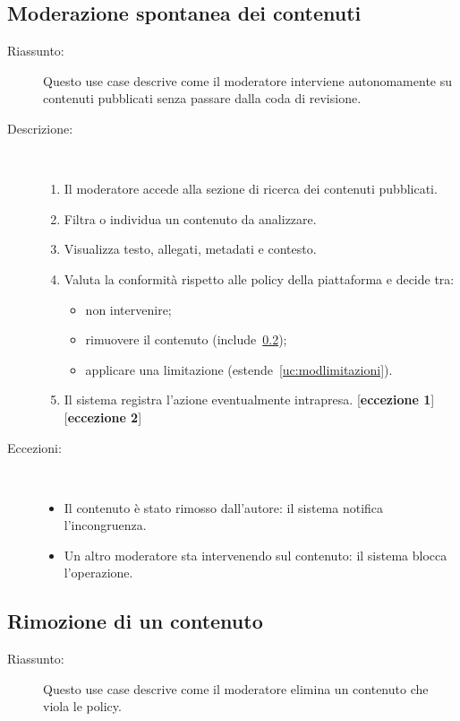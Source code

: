 \begin{ucscope}
\subsection{Moderazione spontanea dei contenuti} \label{uc:modspontanea}

\begin{description}
	\item[Riassunto:]
	Questo use case descrive come il moderatore interviene autonomamente su contenuti pubblicati senza passare dalla coda di revisione.

	\item[Descrizione:]~
	\begin{enumerate}
		\item Il moderatore accede alla sezione di ricerca dei contenuti pubblicati.
		\item Filtra o individua un contenuto da analizzare.
		\item Visualizza testo, allegati, metadati e contesto.
		\item Valuta la conformità rispetto alle policy della piattaforma e decide tra:
		\begin{itemize}
			\item non intervenire;
			\item rimuovere il contenuto (include~\ref{uc:rimozione});
			\item applicare una limitazione (estende~\ref{uc:modlimitazioni}).
		\end{itemize}
		\item Il sistema registra l’azione eventualmente intrapresa. [\textbf{eccezione 1}] [\textbf{eccezione 2}]
	\end{enumerate}

	\item[Eccezioni:]~
	\begin{itemize}
		\item[(1)] Il contenuto è stato rimosso dall’autore: il sistema notifica l’incongruenza.
		\item[(2)] Un altro moderatore sta intervenendo sul contenuto: il sistema blocca l’operazione.
	\end{itemize}
\end{description}

\subsection{Rimozione di un contenuto} \label{uc:rimozione}

\begin{description}
	\item[Riassunto:]
	Questo use case descrive come il moderatore elimina un contenuto che viola le policy.


\end{description}
\end{ucscope}
